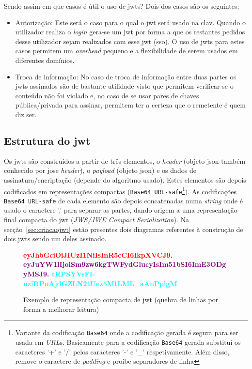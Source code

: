Sendo assim em que casos é útil o uso de \acrshort{jwt}s? Dois dos casos são os seguintes:
\begin{itemize}
    \item Autorização: Este será o caso para o qual o \acrshort{jwt} será usado na \acrshort{clav}. Quando o utilizador realiza o \textit{login} gera-se um \acrshort{jwt} por forma a que os restantes pedidos desse utilizador sejam realizados com esse \acrshort{jwt} (\acrlong{sso}). O uso de \acrshort{jwt}s para estes casos permitem um \textit{overhead} pequeno e a flexibilidade de serem usados em diferentes domínios.
    \item Troca de informação: No caso de troca de informação entre duas partes os \acrshort{jwt}s assinados são de bastante utilidade visto que permitem verificar se o conteúdo não foi violado e, no caso de se usar pares de chaves pública/privada para assinar, permitem ter a certeza que o remetente é quem diz ser.
\end{itemize}

\subsection{Estrutura do \acrshort{jwt}}

Os \acrshort{jwt}s são construídos a partir de três elementos, o \textit{header} (objeto \acrshort{json} também conhecido por \acrshort{jose} \textit{header}), o \textit{payload} (objeto \acrshort{json}) e os dados de assinatura/encriptação (depende do algoritmo usado). Estes elementos são depois codificados em representações compactas (\texttt{Base64 URL-safe}\footnote{Variante da codificação \texttt{Base64} onde a codificação gerada é segura para ser usada em \textit{URL}s. Basicamente para a codificação \texttt{Base64} gerada substitui os caracteres '+' e '/' pelos caracteres '-' e '\_' respetivamente. Além disso, remove o caractere de \textit{padding} e proíbe separadores de linha}). As codificações \texttt{Base64 URL-safe} de cada elemento são depois concatenadas numa \textit{string} onde é usado o caractere '.' para separar as partes, dando origem a uma representação final compacta do \acrshort{jwt} (\textit{JWS/JWE Compact Serialization}). Na secção~\ref{sec:criacaojwt} estão presentes dois diagramas referentes à construção de dois \acrshort{jwt}s sendo um deles assinado.

\begin{figure}[H]
    \centering
    \textbf{\textcolor{red}{eyJhbGciOiJIUzI1NiIsInR5cCI6IkpXVCJ9}.
        \textcolor{purple}{eyJuYW1lIjoiSm9zw6kgTWFydGlucyIsIm51bSI6ImE3ODgyMSJ9}.
        \textcolor{cyan}{tRPSYVsFI-nziRPuAjdGZLN2tUez5MtLML\_aAnPplgM}
    }
    \caption{Exemplo de representação compacta de \acrshort{jwt} (quebra de linhas por forma a melhorar leitura)}\label{fig:exemjwt}
\end{figure}


